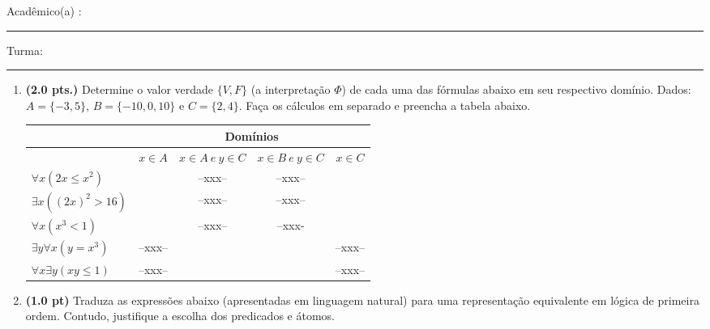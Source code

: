 \documentclass[a4paper,11pt]{article}
\begin{document}


\vskip 0.5cm Acad\^emico(a) : \rule{10cm}{0.4pt} Turma:  \rule{1cm}{0.4pt}

\begin{enumerate}
\setlength{\itemsep}{-1pt}



\item {\bf (2.0 pts.)} Determine o valor verdade $\{V, F \}$ (a interpretação $\Phi $)
de cada uma das fórmulas abaixo em seu respectivo domínio. Dados: $A = \{ -3,  5 \}$, $B = \{ -10, 0, 10\}$ e  $C = \{ 2,  4 \}$.
Faça os cálculos em separado e preencha a tabela abaixo.

\begin{center}
\begin{tabular}{l|c|c|c|c} \hline \hline
 & \multicolumn{4}{c}{Domínios} \\ \hline
 & $ x \in A$ & $x \in A ~e~ y \in C$ & $x \in B ~e~ y \in C$ & $x \in C$ \\ \hline

$\forall x (2x \leq x^2)$ & & --xxx-- & --xxx--  & \\ \hline
$\exists x ((2x)^2 > 16)$ & &  --xxx-- & --xxx--  & \\ \hline
$\forall x (x^3 < 1)$ & &  --xxx-- & --xxx-  & \\ \hline
$\exists y \forall x (y = x^3)$ & --xxx-- &  & & --xxx-- \\ \hline
$\forall x \exists y (xy \leq 1)$ & --xxx-- &  & & --xxx-- \\ \hline \hline
\end{tabular}
\end{center}


\item {\bf (1.0 pt)} Traduza as expressões abaixo (apresentadas em linguagem natural) para uma representação equivalente em lógica de primeira ordem. Contudo, 
justifique a escolha dos predicados e átomos.


\end{enumerate}
\end{document}
